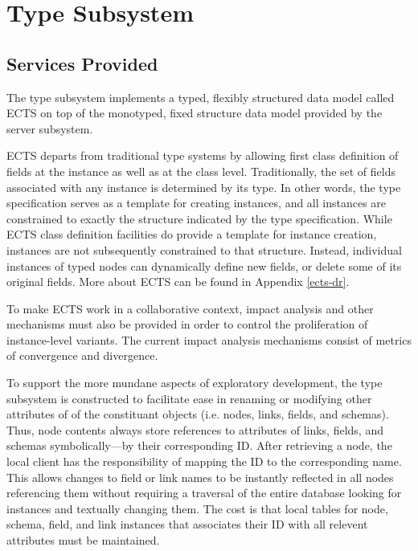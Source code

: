 \section{Type Subsystem}

\subsection{Services Provided}

The type subsystem implements a typed, flexibly structured data
model called ECTS on top of the monotyped, fixed structure data model
provided by the server subsystem. 

ECTS departs from traditional type systems by allowing first class
definition of fields at the instance as well as at the class level.
Traditionally, the set of fields associated with any instance is
determined by its type. In other words, the type specification serves
as a template for creating instances, and all instances are
constrained to exactly the structure indicated by the type
specification.  While ECTS class definition facilities do provide a
template for instance creation, instances are not subsequently
constrained to that structure. Instead, individual instances of typed
nodes can dynamically define new fields, or delete some of its
original fields. More about ECTS can be found in Appendix \ref{ects-dr}.

To make ECTS work in a collaborative context, impact analysis and other
mechanisms must also be provided in order to control the proliferation of
instance-level variants. The current impact analysis mechanisms consist of
metrics of convergence and divergence.

To support the more mundane aspects of exploratory development, the
type subsystem is constructed to facilitate ease in renaming or
modifying other attributes of of the constituant objects (i.e. nodes,
links, fields, and schemas).  Thus, node contents always store
references to attributes of links, fields, and schemas
symbolically---by their corresponding ID.  After retrieving a node,
the local client has the responsibility of mapping the ID to the
corresponding name.  This allows changes to field or link names to be
instantly reflected in all nodes referencing them without requiring a
traversal of the entire database looking for instances and textually
changing them.  The cost is that local tables for node, schema, field,
and link instances that associates their ID with all relevent
attributes must be maintained.

